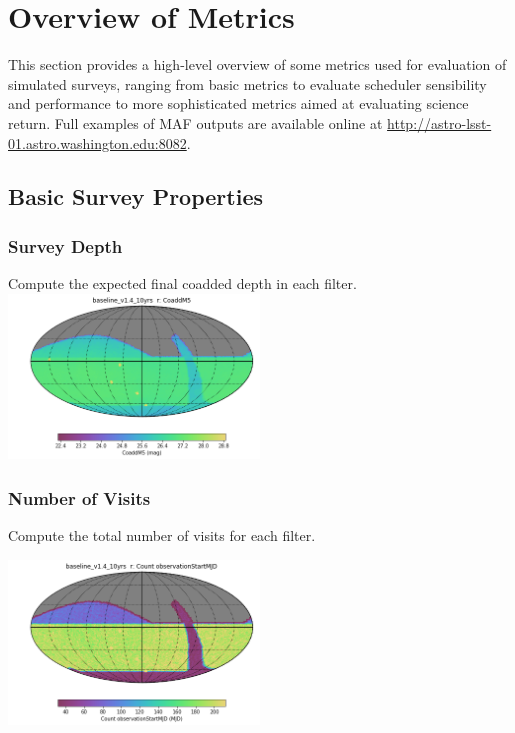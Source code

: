 \section{Overview of Metrics}
This section provides a high-level overview of some metrics used for evaluation of simulated surveys, ranging from basic metrics to evaluate scheduler sensibility and performance to more sophisticated metrics aimed at evaluating science return.
Full examples of MAF outputs are available online at \url{http://astro-lsst-01.astro.washington.edu:8082}.  

\subsection{Basic Survey Properties}

\subsubsection{Survey Depth}

Compute the expected final coadded depth in each filter. 
\centering
\includegraphics[width=0.5\textwidth]{metric_summary/glance/thumb.baseline_v1_4_10yrs_CoaddM5_r_HEAL_SkyMap.png}

\subsubsection{Number of Visits}

Compute the total number of visits for each filter.

\includegraphics[width=0.5\textwidth]{metric_summary/glance/thumb.baseline_v1_4_10yrs_Count_observationStartMJD_r_HEAL_SkyMap.png}

